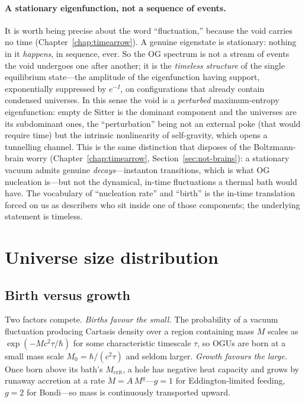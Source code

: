 \paragraph{A stationary eigenfunction, not a sequence of events.} It is worth
being precise about the word ``fluctuation,'' because the void carries no time
(Chapter~\ref{chap:timearrow}). A genuine eigenstate is stationary: nothing in it
\emph{happens}, in sequence, ever. So the OG spectrum is not a stream of events
the void undergoes one after another; it is the \emph{timeless structure} of the
single equilibrium state---the amplitude of the eigenfunction having support,
exponentially suppressed by $e^{-I}$, on configurations that already contain
condensed universes. In this sense the void is a \emph{perturbed} maximum-entropy
eigenfunction: empty de Sitter is the dominant component and the universes are its
subdominant ones, the ``perturbation'' being not an external poke (that would
require time) but the intrinsic nonlinearity of self-gravity, which opens a
tunnelling channel. This is the same distinction that disposes of the
Boltzmann-brain worry (Chapter~\ref{chap:timearrow},
Section~\ref{sec:not-brains}): a stationary vacuum admits genuine
\emph{decays}---instanton transitions, which is what OG nucleation is---but not
the dynamical, in-time fluctuations a thermal bath would have. The vocabulary of
``nucleation rate'' and ``birth'' is the in-time translation forced on us as
describers who sit inside one of those components; the underlying statement is
timeless.

\section{Universe size distribution}

\subsection{Birth versus growth}

Two factors compete. \emph{Births favour the small.} The probability of a vacuum
fluctuation producing Cartasis density over a region containing mass $M$ scales as
$\exp(-M c^2 \tau / \hbar)$ for some characteristic timescale $\tau$, so OGUs are
born at a small mass scale $M_0=\hbar/(c^2\tau)$ and seldom larger. \emph{Growth
favours the large.} Once born above its bath's $M_{\mathrm{crit}}$, a hole has
negative heat capacity and grows by runaway accretion at a rate
$\dot M = A\,M^{g}$---$g=1$ for Eddington-limited feeding, $g=2$ for Bondi---so
mass is continuously transported upward.

